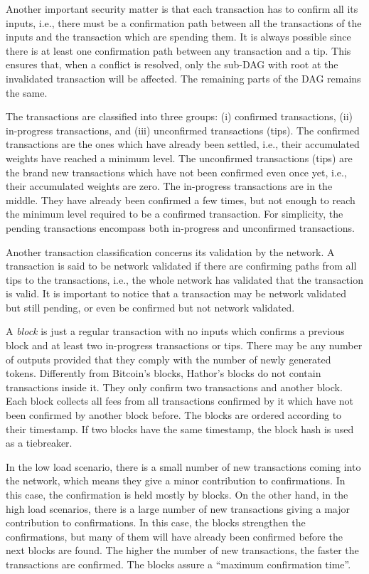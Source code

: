 Another important security matter is that each transaction has to confirm all its inputs, i.e., there must be a confirmation path between all the transactions of the inputs and the transaction which are spending them. It is always possible since there is at least one confirmation path between any transaction and a tip. This ensures that, when a conflict is resolved, only the sub-DAG with root at the invalidated transaction will be affected. The remaining parts of the DAG remains the same.

The transactions are classified into three groups: (i) confirmed transactions, (ii) in-progress transactions, and (iii) unconfirmed transactions (tips). The confirmed transactions are the ones which have already been settled, i.e., their accumulated weights have reached a minimum level. The unconfirmed transactions (tips) are the brand new transactions which have not been confirmed even once yet, i.e., their accumulated weights are zero. The in-progress transactions are in the middle. They have already been confirmed a few times, but not enough to reach the minimum level required to be a confirmed transaction. For simplicity, the pending transactions encompass both in-progress and unconfirmed transactions.

Another transaction classification concerns its validation by the network. A transaction is said to be network validated if there are confirming paths from all tips to the transactions, i.e., the whole network has validated that the transaction is valid. It is important to notice that a transaction may be network validated but still pending, or even be confirmed but not network validated.

A \emph{block} is just a regular transaction with no inputs which confirms a previous block and at least two in-progress transactions or tips. There may be any number of outputs provided that they comply with the number of newly generated tokens. Differently from Bitcoin's blocks, Hathor's blocks do not contain transactions inside it. They only confirm two transactions and another block. Each block collects all fees from all transactions confirmed by it which have not been confirmed by another block before. The blocks are ordered according to their timestamp. If two blocks have the same timestamp, the block hash is used as a tiebreaker.

In the low load scenario, there is a small number of new transactions coming into the network, which means they give a minor contribution to confirmations. In this case, the confirmation is held mostly by blocks. On the other hand, in the high load scenarios, there is a large number of new transactions giving a major contribution to confirmations. In this case, the blocks strengthen the confirmations, but many of them will have already been confirmed before the next blocks are found. The higher the number of new transactions, the faster the transactions are confirmed. The blocks assure a ``maximum confirmation time''.

